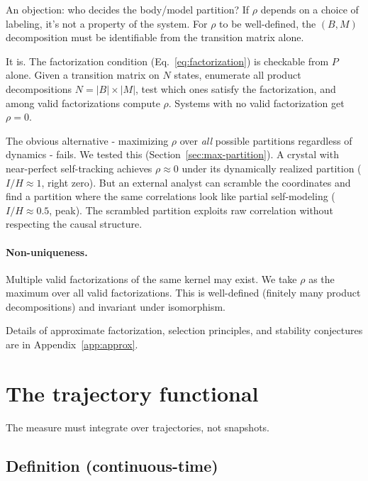 \documentclass[12pt]{article}
\theoremstyle{remark}
\begin{document}
An objection: who decides the body/model partition? If $\rho$ depends on a choice of labeling, it's not a property of the system. For $\rho$ to be well-defined, the $(B, M)$ decomposition must be identifiable from the transition matrix alone.

It is. The factorization condition (Eq.~\ref{eq:factorization}) is checkable from $P$ alone. Given a transition matrix on $N$ states, enumerate all product decompositions $N = |B| \times |M|$, test which ones satisfy the factorization, and among valid factorizations compute $\rho$. Systems with no valid factorization get $\rho = 0$.

The obvious alternative - maximizing $\rho$ over \emph{all} possible partitions regardless of dynamics - fails. We tested this (Section~\ref{sec:max-partition}). A crystal with near-perfect self-tracking achieves $\rho \approx 0$ under its dynamically realized partition ($I/H \approx 1$, right zero). But an external analyst can scramble the coordinates and find a partition where the same correlations look like partial self-modeling ($I/H \approx 0.5$, peak). The scrambled partition exploits raw correlation without respecting the causal structure.

\paragraph{Non-uniqueness.} Multiple valid factorizations of the same kernel may exist. We take $\rho$ as the maximum over all valid factorizations. This is well-defined (finitely many product decompositions) and invariant under isomorphism.

Details of approximate factorization, selection principles, and stability conjectures are in Appendix~\ref{app:approx}.



\section{The trajectory functional}\label{sec:trajectory}

The measure must integrate over trajectories, not snapshots.

\subsection{Definition (continuous-time)}\label{sec:trajectory-def}
\end{document}
